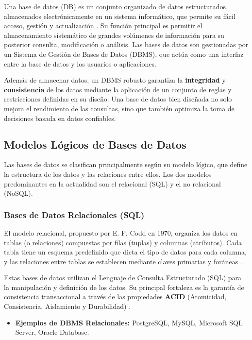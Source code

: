 Una base de datos (DB) es un conjunto organizado de datos estructurados, almacenados electrónicamente en un sistema informático, que permite su fácil acceso, gestión y actualización \cite{mullins2012database}. Su función principal es permitir el almacenamiento sistemático de grandes volúmenes de información para su posterior consulta, modificación o análisis. Las bases de datos son gestionadas por un Sistema de Gestión de Bases de Datos (DBMS), que actúa como una interfaz entre la base de datos y los usuarios o aplicaciones.

Además de almacenar datos, un DBMS robusto garantiza la \textbf{integridad} y \textbf{consistencia} de los datos mediante la aplicación de un conjunto de reglas y restricciones definidas en su diseño. Una base de datos bien diseñada no solo mejora el rendimiento de las consultas, sino que también optimiza la toma de decisiones basada en datos confiables.

\subsection{Modelos Lógicos de Bases de Datos}
\label{subsec:modelos_logicos_db}

Las bases de datos se clasifican principalmente según su modelo lógico, que define la estructura de los datos y las relaciones entre ellos. Los dos modelos predominantes en la actualidad son el relacional (SQL) y el no relacional (NoSQL).

\subsubsection{Bases de Datos Relacionales (SQL)}
El modelo relacional, propuesto por E. F. Codd en 1970, organiza los datos en tablas (o relaciones) compuestas por filas (tuplas) y columnas (atributos). Cada tabla tiene un esquema predefinido que dicta el tipo de datos para cada columna, y las relaciones entre tablas se establecen mediante claves primarias y foráneas \cite{oracle2024sql}.

Estas bases de datos utilizan el Lenguaje de Consulta Estructurado (SQL) para la manipulación y definición de los datos. Su principal fortaleza es la garantía de consistencia transaccional a través de las propiedades \textbf{ACID} (Atomicidad, Consistencia, Aislamiento y Durabilidad) \cite{oracle2024acid}.
\begin{itemize}
    \item \textbf{Ejemplos de DBMS Relacionales:} PostgreSQL, MySQL, Microsoft SQL Server, Oracle Database.
\end{itemize}

